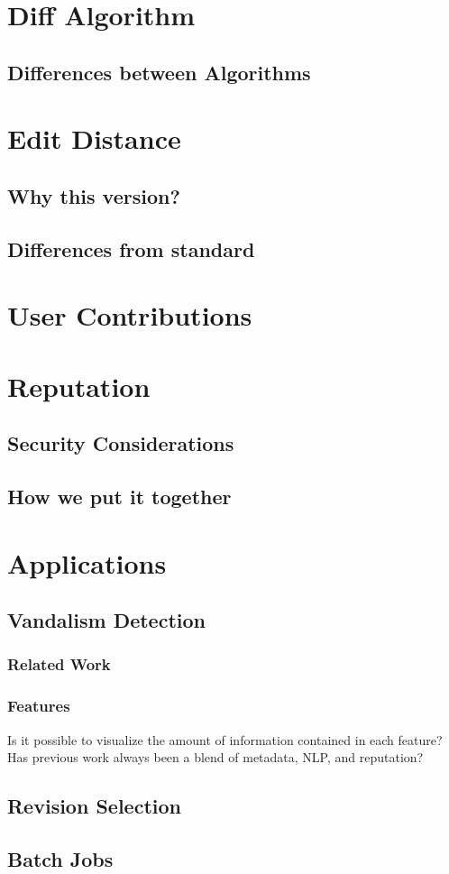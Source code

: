 \chapter{Diff Algorithm}
    \section{Differences between Algorithms}
\chapter{Edit Distance}
    \section{Why this version?}
    \section{Differences from standard}
\chapter{User Contributions}
\chapter{Reputation}
    \section{Security Considerations}
    \section{How we put it together}
\chapter{Applications}
    \section{Vandalism Detection}
        \subsection{Related Work}
        \subsection{Features}
            Is it possible to visualize the amount of information
            contained in each feature?
            Has previous work always been a blend of metadata, NLP,
            and reputation?
    \section{Revision Selection}
    \section{Batch Jobs}

